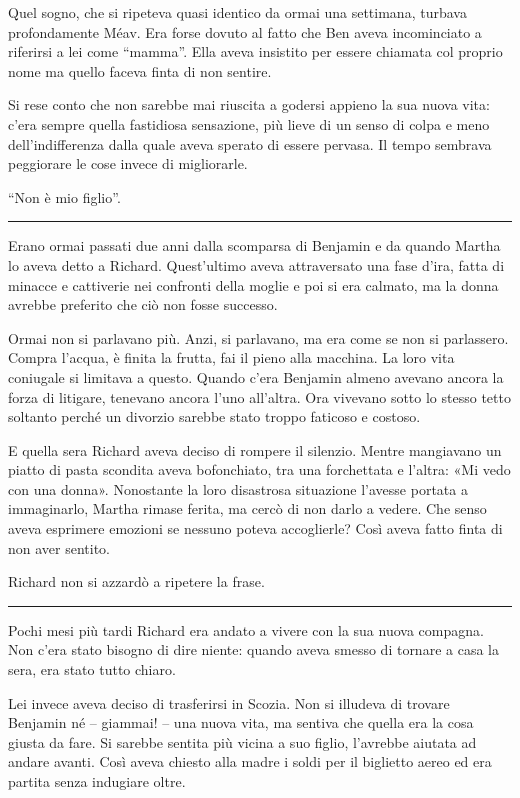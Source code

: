 \documentclass[a4paper,10pt]{memoir}
\begin{document}
Quel sogno, che si ripeteva quasi identico da ormai una settimana, turbava profondamente Méav. Era forse dovuto al fatto
che Ben aveva incominciato a riferirsi a lei come ``mamma''. Ella aveva insistito per essere chiamata col proprio nome
ma quello faceva finta di non sentire.

Si rese conto che non sarebbe mai riuscita a godersi appieno la sua nuova vita: c'era sempre quella fastidiosa
sensazione, più lieve di un senso di colpa e meno dell'indifferenza dalla quale aveva sperato di essere pervasa. Il
tempo sembrava peggiorare le cose invece di migliorarle.

``Non è mio figlio''.

\plainbreak{1}

Erano ormai passati due anni dalla scomparsa di Benjamin e da quando Martha lo aveva detto a Richard. Quest'ultimo aveva
attraversato una fase d'ira, fatta di minacce e cattiverie nei confronti della moglie e poi si era calmato, ma la donna
avrebbe preferito che ciò non fosse successo.

Ormai non si parlavano più. Anzi, si parlavano, ma era come se non si parlassero. Compra l'acqua, è finita la frutta,
fai il pieno alla macchina. La loro vita coniugale si limitava a questo. Quando c'era Benjamin almeno avevano ancora la
forza di litigare, tenevano ancora l'uno all'altra. Ora vivevano sotto lo stesso tetto soltanto perché un divorzio
sarebbe stato troppo faticoso e costoso.

E quella sera Richard aveva deciso di rompere il silenzio. Mentre mangiavano un piatto di pasta scondita aveva
bofonchiato, tra una forchettata e l'altra: «Mi vedo con una donna». Nonostante la loro disastrosa situazione l'avesse
portata a immaginarlo, Martha rimase ferita, ma cercò di non darlo a vedere. Che senso aveva esprimere emozioni se
nessuno poteva accoglierle? Così aveva fatto finta di non aver sentito.

Richard non si azzardò a ripetere la frase.

\plainbreak{1}

Pochi mesi più tardi Richard era andato a vivere con la sua nuova compagna. Non c'era stato bisogno di dire niente:
quando aveva smesso di tornare a casa la sera, era stato tutto chiaro.

Lei invece aveva deciso di trasferirsi in Scozia. Non si illudeva di trovare Benjamin né -- giammai! -- una nuova vita,
ma sentiva che quella era la cosa giusta da fare. Si sarebbe sentita più vicina a suo figlio, l'avrebbe aiutata ad
andare avanti. Così aveva chiesto alla madre i soldi per il biglietto aereo ed era partita senza indugiare oltre.
\end{document}
